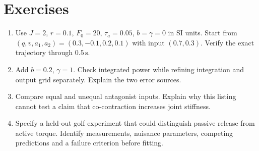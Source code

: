 \section*{Exercises}
\begin{enumerate}
 \item Use $J=2$, $r=0.1$, $F_0=20$, $\tau_a=0.05$, $b=\gamma=0$ in SI units.
 Start from $(q,v,a_1,a_2)=(0.3,-0.1,0.2,0.1)$ with input $(0.7,0.3)$.
 Verify the exact trajectory through $0.5\,\mathrm s$.
 \item Add $b=0.2$, $\gamma=1$. Check integrated power while refining integration
 and output grid separately. Explain the two error sources.
 \item Compare equal and unequal antagonist inputs. Explain why this listing
 cannot test a claim that co-contraction increases joint stiffness.
 \item Specify a held-out golf experiment that could distinguish passive release
 from active torque. Identify measurements, nuisance parameters, competing
 predictions and a failure criterion before fitting.
\end{enumerate}
